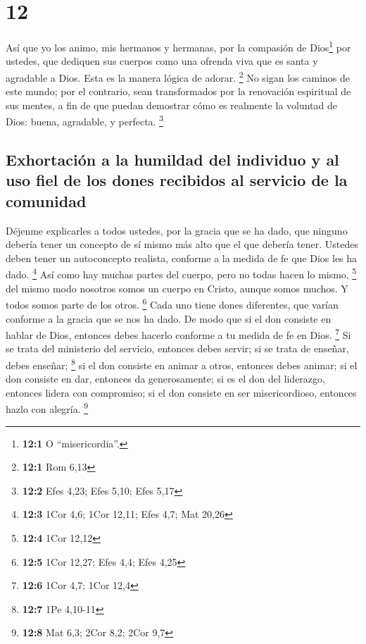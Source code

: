 \hypertarget{section-11}{%
\section{12}\label{section-11}}

 Así que yo los animo, mis hermanos y hermanas, por la
compasión de Dios\footnote{\textbf{12:1} O ``misericordia''.} por
ustedes, que dediquen sus cuerpos como una ofrenda viva que es santa y
agradable a Dios. Esta es la manera lógica de adorar. \footnote{\textbf{12:1}
  Rom 6,13}  No sigan los caminos de este mundo; por el
contrario, sean transformados por la renovación espiritual de sus
mentes, a fin de que puedan demostrar cómo es realmente la voluntad de
Dios: buena, agradable, y perfecta. \footnote{\textbf{12:2} Efes 4,23;
  Efes 5,10; Efes 5,17}

\hypertarget{exhortaciuxf3n-a-la-humildad-del-individuo-y-al-uso-fiel-de-los-dones-recibidos-al-servicio-de-la-comunidad}{%
\subsection{Exhortación a la humildad del individuo y al uso fiel de los
dones recibidos al servicio de la
comunidad}\label{exhortaciuxf3n-a-la-humildad-del-individuo-y-al-uso-fiel-de-los-dones-recibidos-al-servicio-de-la-comunidad}}

 Déjenme explicarles a todos ustedes, por la gracia que se
ha dado, que ninguno debería tener un concepto de sí mismo más alto que
el que debería tener. Ustedes deben tener un autoconcepto realista,
conforme a la medida de fe que Dios les ha dado. \footnote{\textbf{12:3}
  1Cor 4,6; 1Cor 12,11; Efes 4,7; Mat 20,26}  Así como hay
muchas partes del cuerpo, pero no todas hacen lo mismo, \footnote{\textbf{12:4}
  1Cor 12,12}  del mismo modo nosotros somos un cuerpo en
Cristo, aunque somos muchos. Y todos somos parte de los otros.
\footnote{\textbf{12:5} 1Cor 12,27; Efes 4,4; Efes 4,25} 
Cada uno tiene dones diferentes, que varían conforme a la gracia que se
nos ha dado. De modo que si el don consiste en hablar de Dios, entonces
debes hacerlo conforme a tu medida de fe en Dios. \footnote{\textbf{12:6}
  1Cor 4,7; 1Cor 12,4}  Si se trata del ministerio del
servicio, entonces debes servir; si se trata de enseñar, debes enseñar;
\footnote{\textbf{12:7} 1Pe 4,10-11}  si el don consiste
en animar a otros, entonces debes animar; si el don consiste en dar,
entonces da generosamente; si es el don del liderazgo, entonces lidera
con compromiso; si el don consiste en ser misericordioso, entonces hazlo
con alegría. \footnote{\textbf{12:8} Mat 6,3; 2Cor 8,2; 2Cor 9,7}

